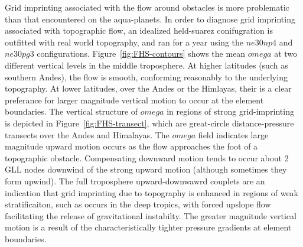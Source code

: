 \documentclass[twocol]{ametsoc}
\begin{document}
Grid imprinting associated with the flow around obstacles is more problematic than that encountered on the aqua-planets. In order to diagnose grid imprinting associated with topographic flow, an idealized held-suarez conifugration \citep{HS1994} is outfitted with real world topography, and ran for a year using the $ne30np4$ and $ne30pg3$ configurations. Figure~\ref{fig:FHS-contours} shows the mean $omega$ at two different vertical levels in the middle troposphere. At higher latitudes (such as southern Andes), the flow is smooth, conforming reasonably to the underlying topography. At lower latitudes, over the Andes or the Himlayas, their is a clear preferance for larger magnitude vertical motion to occur at the element boundaries. The vertical structure of $omega$ in regions of strong grid-imprinting is depicted in Figure~\ref{fig:FHS-transect}, which are great-circle distance-pressure transects over the Andes and Himalayas. The $omega$ field indicates large magnitude upward motion occurs as the flow approaches the foot of a topographic obstacle. Compensating downward motion tends to occur about 2 GLL nodes downwind of the strong upward motion (although sometimes they form upwind). The full troposphere upward-downwawrd couplets are an indication that grid imprinting due to topography is enhanced in regions of weak stratificaiton, such as occurs in the deep tropics, with forced upslope flow facilitating the release of gravitational instabilty. The greater magnitude vertical motion is a result of the characteristically tighter pressure gradients at element boundaries. 
\end{document}
